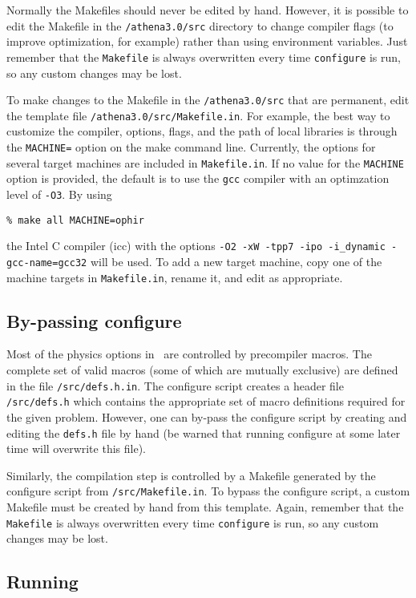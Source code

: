 Normally the Makefiles should never be edited by hand.  However,
it is possible to edit the Makefile in the {\tt /athena3.0/src} directory to
change compiler flags (to improve optimization, for example)
rather than using
environment variables.  Just remember that the {\tt Makefile} is always 
overwritten every time {\tt configure} is run, so any custom changes may be
lost.

To make changes to the Makefile in the {\tt /athena3.0/src} that are permanent,
edit the template file {\tt /athena3.0/src/Makefile.in}.
For example, the best way to customize the compiler, options, flags,
and the path of local libraries is through the {\tt MACHINE=} option
on the make command line.  Currently, the options for several target machines are
included in {\tt Makefile.in}.  If no value for the {\tt MACHINE} option is
provided, the default is to use the {\tt gcc} compiler
with an optimzation level of {\tt -O3}.  By using
\begin{verbatim}
% make all MACHINE=ophir
\end{verbatim}
the Intel C compiler (icc) with the options
{\tt -O2 -xW -tpp7 -ipo -i\_dynamic -gcc-name=gcc32} will be used.  To add
a new target machine, copy one of the machine targets in {\tt Makefile.in},
rename it, and edit as appropriate. 

\subsection{By-passing configure}

Most of the physics options in \ath\ are controlled by precompiler macros.  The
complete set of valid macros (some of which are mutually exclusive) are
defined in the file {\tt /src/defs.h.in}.  
The configure script creates a header file {\tt /src/defs.h} which contains
the appropriate set of macro definitions required for the given problem.
However, one can by-pass the configure script by creating and editing the
{\tt defs.h} file by hand (be warned that running configure at some later time
will overwrite this file).

Similarly, the compilation step is controlled by a Makefile generated by
the configure script from {\tt /src/Makefile.in}.  To bypass the configure
script, a custom Makefile must be created by hand from this template.
Again, remember that the {\tt Makefile} is always
overwritten every time {\tt configure} is run, so any custom changes may be
lost.

\subsection{Running \ath}

